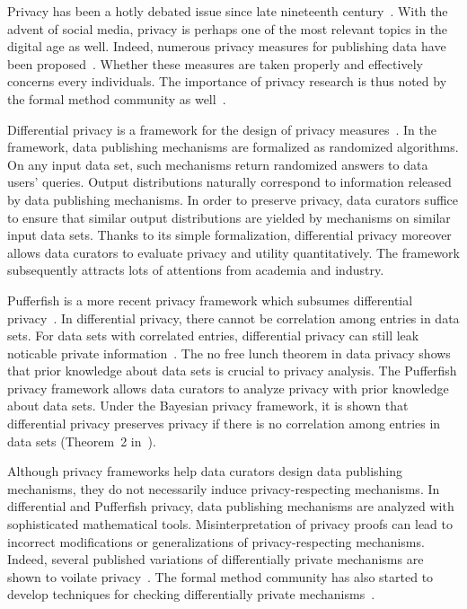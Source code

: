 

Privacy has been a hotly debated issue since late nineteenth
century~\cite{WB:90:RP}. With the advent of social media, privacy is
perhaps one of the most relevant topics in the digital age as
well. Indeed, numerous privacy measures for publishing data 
have been proposed~\cite{S:2002:KAMPP,FWC:10:PPDP}. Whether these
measures are taken properly and effectively concerns every
individuals. The importance of privacy research is thus noted by the
formal method community as well~\cite{TW:09:FMP}.


Differential privacy is a framework for the design of privacy
measures~\cite{D:06:DP,DR:14:AFDP}. In the framework, data publishing
mechanisms are formalized as randomized algorithms. On any input data
set, such mechanisms return randomized answers to data users' queries. 
Output distributions naturally correspond to information released by
data publishing mechanisms. In order to preserve privacy, data
curators suffice to ensure that similar output distributions are
yielded by mechanisms on similar input data sets. Thanks to its simple
formalization, differential privacy moreover allows data curators 
to evaluate privacy and utility quantitatively. The framework
subsequently attracts lots of attentions from academia and industry.


Pufferfish is a more recent privacy framework which subsumes
differential privacy~\cite{KM:14:PFMPD}. In differential privacy,
there cannot be correlation among entries in data sets. For data sets
with correlated entries, differential privacy can still leak
noticable private information~\cite{KM:11:NFLDP}. The no free lunch
theorem in data privacy shows that prior knowledge about data sets is
crucial to privacy analysis. The Pufferfish privacy framework allows
data curators to analyze privacy with prior knowledge about data
sets. Under the Bayesian privacy framework, it is shown that
differential privacy preserves privacy if there is no correlation
among entries in data sets (Theorem~2 in~\cite{KM:14:PFMPD}).


Although privacy frameworks help data curators design data publishing
mechanisms, they do not necessarily induce privacy-respecting
mechanisms. In differential and Pufferfish privacy, data publishing
mechanisms are analyzed with sophisticated mathematical tools. 
Misinterpretation of privacy proofs can lead to incorrect
modifications or generalizations of privacy-respecting mechanisms. 
Indeed, several published variations of differentially private
mechanisms are shown to voilate privacy~\cite{DWWZK:18:DVDP}. The
formal method community has also started to develop techniques for
checking differentially private
mechanisms~\cite{TKD:11:FVDPIS,GHHNP:13:LDTDP,BDGKZ:13:VCDP}. 

